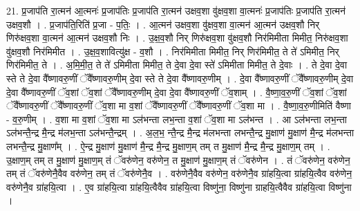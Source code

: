 \documentclass[17pt]{extarticle}
\begin{document}
21. प्र॒जाप॑ति रा॒त्मन॑ आ॒त्मनः॑ प्र॒जाप॑तिः प्र॒जाप॑ति रा॒त्मन॑ उक्षव॒शा वु॑क्षव॒शा वा॒त्मनः॑ प्र॒जाप॑तिः प्र॒जाप॑ति रा॒त्मन॑ उक्षव॒शौ । . प्र॒जाप॑ति॒रिति॑ प्र॒जा - प॒तिः॒ । . आ॒त्मन॑ उक्षव॒शा वु॑क्षव॒शा वा॒त्मन॑ आ॒त्मन॑ उक्षव॒शौ निर् णिरु॑क्षव॒शा वा॒त्मन॑ आ॒त्मन॑ उक्षव॒शौ निः । . उ॒क्ष॒व॒शौ निर् णिरु॑क्षव॒शा वु॑क्षव॒शौ निर॑मिमीता मिमीत॒ निरु॑क्षव॒शा वु॑क्षव॒शौ निर॑मिमीत । . उ॒क्ष॒व॒शावित्यु॑क्ष - व॒शौ । . निर॑मिमीता मिमीत॒ निर् णिर॑मिमीत॒ ते ते॑ ऽमिमीत॒ निर् णिर॑मिमीत॒ ते । . अ॒मि॒मी॒त॒ ते ते॑ ऽमिमीता मिमीत॒ ते दे॒वा दे॒वा स्ते॑ ऽमिमीता मिमीत॒ ते दे॒वाः । . ते दे॒वा दे॒वा स्ते ते दे॒वा वै᳚ष्णावरु॒णीं ॅवै᳚ष्णावरु॒णीम् दे॒वा स्ते ते दे॒वा वै᳚ष्णावरु॒णीम् । . दे॒वा वै᳚ष्णावरु॒णीं ॅवै᳚ष्णावरु॒णीम् दे॒वा दे॒वा वै᳚ष्णावरु॒णीं ॅव॒शां ॅव॒शां ॅवै᳚ष्णावरु॒णीम् दे॒वा दे॒वा वै᳚ष्णावरु॒णीं ॅव॒शाम् । . वै॒ष्णा॒व॒रु॒णीं ॅव॒शां ॅव॒शां ॅवै᳚ष्णावरु॒णीं ॅवै᳚ष्णावरु॒णीं ॅव॒शा मा व॒शां ॅवै᳚ष्णावरु॒णीं ॅवै᳚ष्णावरु॒णीं ॅव॒शा मा । . वै॒ष्णा॒व॒रु॒णीमिति॑ वैष्णा - व॒रु॒णीम् । . व॒शा मा व॒शां ॅव॒शा मा ऽल॑भन्ता लभ॒न्ता व॒शां ॅव॒शा मा ऽल॑भन्त । . आ ऽल॑भन्ता लभ॒न्ता ऽल॑भन्तै॒न्द्र मै॒न्द्र म॑लभ॒न्ता ऽल॑भन्तै॒न्द्रम् । . अ॒ल॒भ॒ न्तै॒न्द्र मै॒न्द्र म॑लभन्ता लभन्तै॒न्द्र मु॒क्षाण॑ मु॒क्षाण॑ मै॒न्द्र म॑लभन्ता लभन्तै॒न्द्र मु॒क्षाण᳚म् । . ऐ॒न्द्र मु॒क्षाण॑ मु॒क्षाण॑ मै॒न्द्र मै॒न्द्र मु॒क्षाण॒म् तम् त मु॒क्षाण॑ मै॒न्द्र मै॒न्द्र मु॒क्षाण॒म् तम् । . उ॒क्षाण॒म् तम् त मु॒क्षाण॑ मु॒क्षाण॒म् तं ॅवरु॑णेन॒ वरु॑णेन॒ त मु॒क्षाण॑ मु॒क्षाण॒म् तं ॅवरु॑णेन । . तं ॅवरु॑णेन॒ वरु॑णेन॒ तम् तं ॅवरु॑णेनै॒वैव वरु॑णेन॒ तम् तं ॅवरु॑णेनै॒व । . वरु॑णेनै॒वैव वरु॑णेन॒ वरु॑णेनै॒व ग्रा॑हयि॒त्वा ग्रा॑हयि॒त्वैव वरु॑णेन॒ वरु॑णेनै॒व ग्रा॑हयि॒त्वा । . ए॒व ग्रा॑हयि॒त्वा ग्रा॑हयि॒त्वैवैव ग्रा॑हयि॒त्वा विष्णु॑ना॒ विष्णु॑ना ग्राहयि॒त्वैवैव ग्रा॑हयि॒त्वा विष्णु॑ना । \newline
\end{document}
